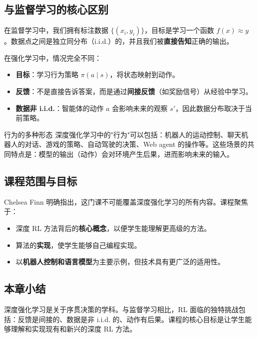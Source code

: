 \documentclass[a4paper]{article}
\begin{document}
\subsection{与监督学习的核心区别}

在监督学习中，我们拥有标注数据 $\{(x_i, y_i)\}$，目标是学习一个函数 $f(x) \approx y$。数据点之间是独立同分布（i.i.d.）的，并且我们被\textbf{直接告知}正确的输出。

在强化学习中，情况完全不同：

\begin{itemize}
    \item \textbf{目标}：学习行为策略 $\pi(a \mid s)$，将状态映射到动作。
    \item \textbf{反馈}：不是直接告诉答案，而是通过\textbf{间接反馈}（如奖励信号）从经验中学习。
    \item \textbf{数据非 i.i.d.}：智能体的动作 $a$ 会影响未来的观察 $s'$，因此数据分布取决于当前策略。
\end{itemize}

\begin{knowledgebox}{行为的多种形态}
深度强化学习中的"行为"可以包括：机器人的运动控制、聊天机器人的对话、游戏的策略、自动驾驶的决策、Web agent 的操作等。这些场景的共同特点是：模型的输出（动作）会对环境产生后果，进而影响未来的输入。
\end{knowledgebox}

\subsection{课程范围与目标}

Chelsea Finn 明确指出，这门课不可能覆盖深度强化学习的所有内容。课程聚焦于：
\begin{itemize}
    \item 深度 RL 方法背后的\textbf{核心概念}，以便学生能理解更高级的方法。
    \item 算法的\textbf{实现}，使学生能够自己编程实现。
    \item 以\textbf{机器人控制和语言模型}为主要示例，但技术具有更广泛的适用性。
\end{itemize}

\subsection{本章小结}

深度强化学习是关于序贯决策的学科。与监督学习相比，RL 面临的独特挑战包括：反馈是间接的、数据是非 i.i.d. 的、动作有后果。课程的核心目标是让学生能够理解和实现现有和新兴的深度 RL 方法。
\end{document}
